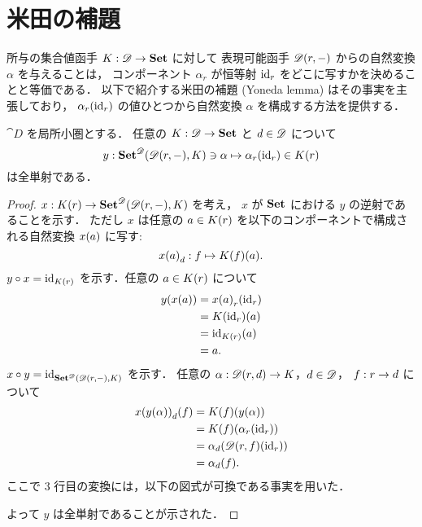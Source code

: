 \documentclass[titlepage]{ltjsreport}
\newtheorem[S]{theorem}{定理}[chapter]
\newtheorem[S]{definition}[theorem]{定義}
\newtheorem[S]{example}[theorem]{例}
\begin{document}
\section{米田の補題}

所与の集合値函手 ${K}:{\mathscr{D}}\to{\mathbf{Set}}$ に対して
表現可能函手 $\mathscr{D}(r,-)$ からの自然変換 $\alpha$ を与えることは，
コンポーネント $\alpha_r$ が恒等射 $\mathrm{id}_{r}$
をどこに写すかを決めることと等価である．
以下で紹介する米田の補題 (Yoneda lemma) はその事実を主張しており，
$\alpha_r(\mathrm{id}_{r})$ の値ひとつから自然変換 $\alpha$ を構成する方法を提供する．

\begin{theorem}[米田の補題]
  \def\c{\obj{c}}%
  \def\d{\obj{d}}%
  \def\r{\obj{r}}%
  $\cat{D}$ を局所小圏とする．
  任意の ${K}:{\mathscr{D}}\to{\mathbf{Set}}$ と $\d\in\objs{\cat{D}}$ について
  \begin{equation}
    y:\set^\cat{D}(\mrps{\cat{D}}{\r}{-},K)\ni\alpha\mapsto\alpha_r(\id{\r})\in K(\r)
  \end{equation}
  は全単射である．
\end{theorem}

\begin{proof}
  \def\a{\obj{a}}%
  \def\d{\obj{d}}%
  \def\r{\obj{r}}%
  ${x}:{K(r)}\to{\mathbf{Set}^{\mathscr{D}}(\mathscr{D}(r,-),K)}$ を考え，
  $x$ が $\mathbf{Set}$ における $y$ の逆射であることを示す．
  ただし $x$ は任意の $\a\in K(r)$ を以下のコンポーネントで構成される自然変換
  $x(\a)$ に写す:
  \begin{equation}
    {x(\a)}_{\d}:f\mapsto K(f)(\a).
  \end{equation}
  $y\circ x=\id{K(\r)}$ を示す．任意の $\a\in K(\r)$ について
  \begin{align*}
    y(x(\a)) & ={x(\a)}_{\r}(\id{\r}) \\
             & =K(\id{\r})(\a)        \\
             & =\id{K(\r)}(\a)        \\
             & =\a.
  \end{align*}
  $x\circ y=\id{\set^\cat{D}(\mrps{\cat{D}}{\r}{-},K)}$ を示す．
  任意の $\alpha:\mrps{\cat{D}}{\r}{\d}\to K$，$\d\in\objs{\cat{D}}$，
  $\mrp{f}{\r}{\d}$ について
  \begin{align*}
    {x(y(\alpha))}_{\d}(f) & =K(f)(y(\alpha))                             \\
                           & =K(f)(\alpha_{\r}(\id{\r}))                  \\
                           & =\alpha_{\d}(\mrps{\cat{D}}{\r}{f}(\id{\r})) \\
                           & =\alpha_{\d}(f).
  \end{align*}
  ここで 3 行目の変換には，以下の図式が可換である事実を用いた．
  \begin{figure}[h]
    \centering
    
  \end{figure}
  よって $y$ は全単射であることが示された．
\end{proof}
\end{document}
